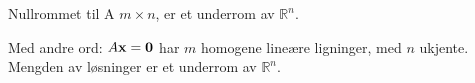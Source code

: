 Nullrommet til A $m\times n$, er et underrom av $\mathbb{R}^n$.

Med andre ord:
$A\mathbf{x}=\mathbf{0}$ har $m$ homogene lineære ligninger, med $n$ ukjente.
Mengden av løsninger er et underrom av $\mathbb{R}^n$.
